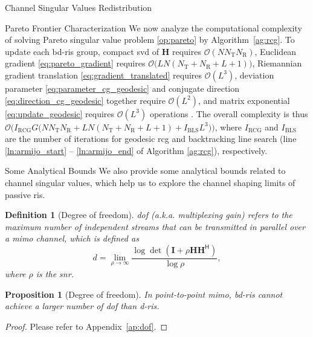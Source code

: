 \documentclass[journal]{IEEEtran}
\newtheorem{definition}{Definition}
\newtheorem{proposition}{Proposition}
\begin{document}
\begin{section}{Channel Singular Values Redistribution}
\begin{subsection}{Pareto Frontier Characterization}
		We now analyze the computational complexity of solving Pareto singular value problem \eqref{op:pareto} by Algorithm~\ref{ag:rcg}.
		To update each \gls{bd}-\gls{ris} group, compact \gls{svd} of $\mathbf{H}$ requires $\mathcal{O}(N N_\mathrm{T} N_\mathrm{R})$, Euclidean gradient \eqref{eq:pareto_gradient} requires $\mathcal{O}\bigl(L N (N_\mathrm{T}+N_\mathrm{R}+L+1) \bigr)$, Riemannian gradient translation \eqref{eq:gradient_translated} requires $\mathcal{O}(L^3)$, deviation parameter \eqref{eq:parameter_cg_geodesic} and conjugate direction \eqref{eq:direction_cg_geodesic} together require $\mathcal{O}(L^2)$, and matrix exponential \eqref{eq:update_geodesic} requires $\mathcal{O}(L^3)$ operations \cite{Moler2003}.
		The overall complexity is thus $\mathcal{O}\bigl(I_\text{RCG} G \bigl(N N_\mathrm{T} N_\mathrm{R} + L N (N_\mathrm{T}+N_\mathrm{R}+L+1) + I_\text{BLS} L^3\bigr)\bigr)$, where $I_\text{RCG}$ and $I_\text{BLS}$ are the number of iterations for geodesic \gls{rcg} and backtracking line search (line \ref{ln:armijo_start} -- \ref{ln:armijo_end} of Algorithm \ref{ag:rcg}), respectively.
	\end{subsection}

	\begin{subsection}{Some Analytical Bounds}\label{sc:bounds}
		We also provide some analytical bounds related to channel singular values, which help us to explore the channel shaping limits of passive \gls{ris}.

		\begin{definition}[Degree of freedom]
			\gls{dof} (a.k.a. multiplexing gain) refers to the maximum number of independent streams that can be transmitted in parallel over a \gls{mimo} channel, which is defined as
			\begin{equation}
				d = \lim_{\rho \to \infty} \frac{\log \det(\mathbf{I} + \rho \mathbf{H} \mathbf{H}^\mathsf{H})}{\log \rho},
			\end{equation}
			where $\rho$ is the \gls{snr}.

		\end{definition}

		\begin{proposition}[Degree of freedom]\label{pp:dof}
			In point-to-point \gls{mimo}, \gls{bd}-\gls{ris} cannot achieve a larger number of \gls{dof} than \gls{d}-\gls{ris}.
		\end{proposition}
		\begin{proof}
			Please refer to Appendix~\ref{ap:dof}.
		\end{proof}


\end{subsection}
\end{section}
\end{document}
